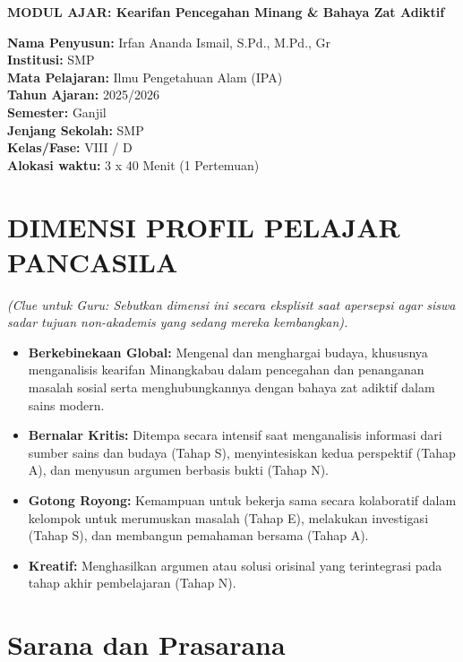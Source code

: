 \documentclass[a4paper,12pt]{article}
\begin{document}
\begin{center}
{\Large\textbf{MODUL AJAR: Kearifan Pencegahan Minang \& Bahaya Zat Adiktif}}
\end{center}

\vspace{0.5cm}

\begin{tcolorbox}[mainbox]
\textbf{Nama Penyusun:} Irfan Ananda Ismail, S.Pd., M.Pd., Gr \\
\textbf{Institusi:} SMP \\
\textbf{Mata Pelajaran:} Ilmu Pengetahuan Alam (IPA) \\
\textbf{Tahun Ajaran:} 2025/2026 \\
\textbf{Semester:} Ganjil \\
\textbf{Jenjang Sekolah:} SMP \\
\textbf{Kelas/Fase:} VIII / D \\
\textbf{Alokasi waktu:} 3 x 40 Menit (1 Pertemuan)
\end{tcolorbox}

\section{DIMENSI PROFIL PELAJAR PANCASILA}
\textit{(Clue untuk Guru: Sebutkan dimensi ini secara eksplisit saat apersepsi agar siswa sadar tujuan non-akademis yang sedang mereka kembangkan).}

\begin{itemize}
\item \textbf{Berkebinekaan Global:} Mengenal dan menghargai budaya, khususnya menganalisis kearifan Minangkabau dalam pencegahan dan penanganan masalah sosial serta menghubungkannya dengan bahaya zat adiktif dalam sains modern.
\item \textbf{Bernalar Kritis:} Ditempa secara intensif saat menganalisis informasi dari sumber sains dan budaya (Tahap S), menyintesiskan kedua perspektif (Tahap A), dan menyusun argumen berbasis bukti (Tahap N).
\item \textbf{Gotong Royong:} Kemampuan untuk bekerja sama secara kolaboratif dalam kelompok untuk merumuskan masalah (Tahap E), melakukan investigasi (Tahap S), dan membangun pemahaman bersama (Tahap A).
\item \textbf{Kreatif:} Menghasilkan argumen atau solusi orisinal yang terintegrasi pada tahap akhir pembelajaran (Tahap N).
\end{itemize}

\section{Sarana dan Prasarana}
\end{document}
